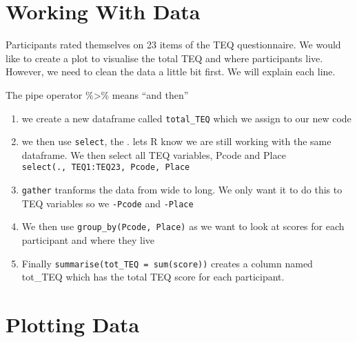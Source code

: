 \documentclass[]{book}
\newenvironment{Shaded}{\begin{snugshade}}{\end{snugshade}}
\newcommand{\KeywordTok}[1]{\textcolor[rgb]{0.13,0.29,0.53}{\textbf{#1}}}
\newcommand{\DataTypeTok}[1]{\textcolor[rgb]{0.13,0.29,0.53}{#1}}
\newcommand{\StringTok}[1]{\textcolor[rgb]{0.31,0.60,0.02}{#1}}
\newcommand{\OperatorTok}[1]{\textcolor[rgb]{0.81,0.36,0.00}{\textbf{#1}}}
\newcommand{\NormalTok}[1]{#1}
\providecommand{\tightlist}{%
  \setlength{\itemsep}{0pt}\setlength{\parskip}{0pt}}
\begin{document}
\section{Working With Data}\label{working-with-data}

Participants rated themselves on 23 items of the TEQ questionnaire. We
would like to create a plot to visualise the total TEQ and where
participants live. However, we need to clean the data a little bit
first. We will explain each line.

The pipe operator \%\textgreater{}\% means ``and then''

\begin{enumerate}
\def\labelenumi{\arabic{enumi}.}
\tightlist
\item
  we create a new dataframe called \texttt{total\_TEQ} which we assign
  to our new code
\item
  we then use \texttt{select}, the . lets R know we are still working
  with the same dataframe. We then select all TEQ variables, Pcode and
  Place \texttt{select(.,\ TEQ1:TEQ23,\ Pcode,\ Place}
\item
  \texttt{gather} tranforms the data from wide to long. We only want it
  to do this to TEQ variables so we \texttt{-Pcode} and \texttt{-Place}
\item
  We then use \texttt{group\_by(Pcode,\ Place)} as we want to look at
  scores for each participant and where they live
\item
  Finally \texttt{summarise(tot\_TEQ\ =\ sum(score))} creates a column
  named tot\_TEQ which has the total TEQ score for each participant.
\end{enumerate}

\begin{Shaded}
\end{Shaded}

\section{Plotting Data}\label{plotting-data}
\end{document}
